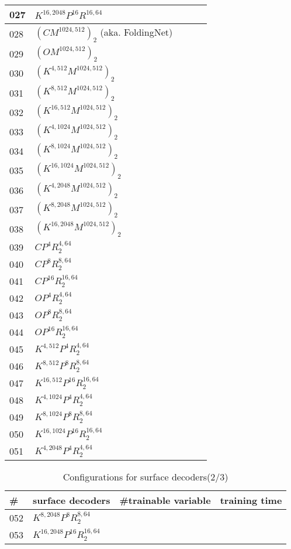\begin{appendices}
\begin{table*}
\begin{tabular}{| l | l | l | l }
		027&$K^{16,2048}P^{16}R^{16,64}$ &~&~\\
		\hline
		028&$(CM^{1024,512})_2$ (aka. FoldingNet\cite{foldingnet})&~&~\\
		029&$(OM^{1024,512})_2$ &~&~\\
		030&$(K^{4,512}M^{1024,512})_2$ &~&~\\
		031&$(K^{8,512}M^{1024,512})_2$ &~&~\\
		032&$(K^{16,512}M^{1024,512})_2$ &~&~\\
		033&$(K^{4,1024}M^{1024,512})_2$ &~&~\\
		034&$(K^{8,1024}M^{1024,512})_2$ &~&~\\
		035&$(K^{16,1024}M^{1024,512})_2$ &~&~\\
		036&$(K^{4,2048}M^{1024,512})_2$ &~&~\\
		037&$(K^{8,2048}M^{1024,512})_2$ &~&~\\
		038&$(K^{16,2048}M^{1024,512})_2$ &~&~\\
		039&$CP^4R^{4,64}_2$ &~&~\\
		040&$CP^{8}R^{8,64}_2$ &~&~\\
		041&$CP^{16}R^{16,64}_2$ &~&~\\
		042&$OP^4R^{4,64}_2$ &~&~\\
		043&$OP^{8}R^{8,64}_2$ &~&~\\
		044&$OP^{16}R^{16,64}_2$ &~&~\\
		045&$K^{4,512}P^{4}R^{4,64}_2$ &~&~\\
		046&$K^{8,512}P^{8}R^{8,64}_2$ &~&~\\
		047&$K^{16,512}P^{16}R^{16,64}_2$ &~&~\\
		048&$K^{4,1024}P^{4}R^{4,64}_2$ &~&~\\
		049&$K^{8,1024}P^{8}R^{8,64}_2$ &~&~\\
		050&$K^{16,1024}P^{16}R^{16,64}_2$ &~&~\\
		051&$K^{4,2048}P^{4}R^{4,64}_2$ &~&~\\
	\end{tabular}
\end{table*}
\begin{table*}
	\caption{Configurations for surface decoders(2/3)}
	\label{tab:surf_dec2}
	\centering
	\begin{tabular}{|l | l | l | l }
		\hline
		\hline
		\# & surface decoders & \#trainable variable & training time \\
		\hline
		052&$K^{8,2048}P^{8}R^{8,64}_2$ &~&~\\
		053&$K^{16,2048}P^{16}R^{16,64}_2$ &~&~\\

\end{tabular}
\end{table*}
\end{appendices}
